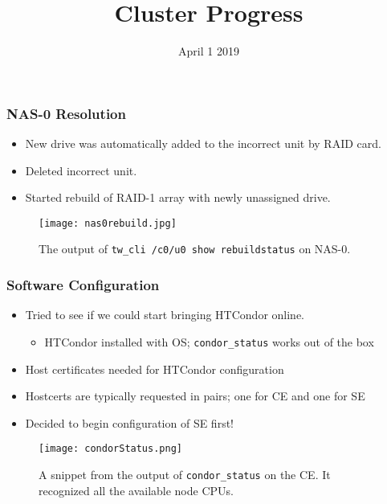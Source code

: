 \documentclass{beamer}
\title{Cluster Progress}
\date{April 1 2019}
\begin{document}

\begin{frame}
  \maketitle
\end{frame}



\begin{frame}

  \frametitle{NAS-0 Resolution}

  \begin{itemize}
    \item New drive was automatically added to the incorrect unit by RAID card.
    \item Deleted incorrect unit.
    \item Started rebuild of RAID-1 array with newly unassigned drive.
  \end{itemize}

  \begin{figure}[H]
    \begin{center}
      \texttt{[image: nas0rebuild.jpg]}
    \end{center}
    \caption{The output of {\tt tw\_cli /c0/u0 show rebuildstatus} on NAS-0.}
  \end{figure}

\end{frame}



\begin{frame}

  \frametitle{Software Configuration}

  \begin{itemize}
    \item Tried to see if we could start bringing HTCondor online.
      \begin{itemize}
        \item HTCondor installed with OS; {\tt condor\_status} works out of the box
      \end{itemize}
    \item Host certificates needed for HTCondor configuration
    \item Hostcerts are typically requested in pairs; one for CE and one for SE
    \item Decided to begin configuration of SE first!
  \end{itemize}

  \begin{figure}[H]
    \begin{center}
      \texttt{[image: condorStatus.png]}
    \end{center}
    \caption{A snippet from the output of {\tt condor\_status} on the CE. It
      recognized all the available node CPUs.}
  \end{figure}

\end{frame}
\end{document}

